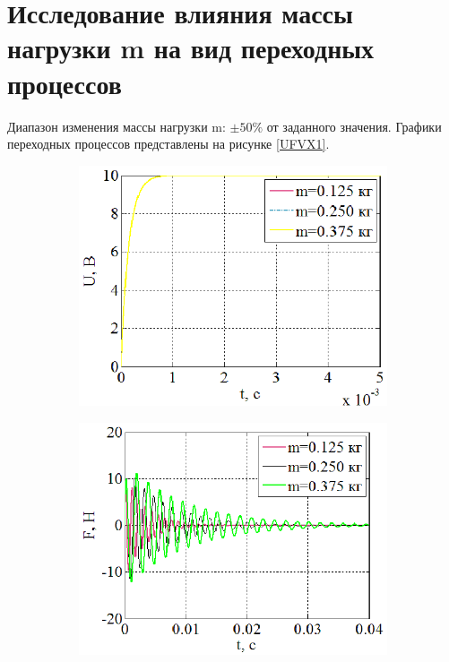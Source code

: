 \documentclass[a4paper,12pt]{article} %
\begin{document}
\section{Исследование влияния массы нагрузки m на вид переходных процессов}
Диапазон изменения массы нагрузки m: $\pm 50\%$  от заданного значения. Графики переходных процессов представлены на рисунке \ref{UFVX1}.
\begin{figure}[H]
	\centering
	\begin{subfigure}[b]{0.48\textwidth}
	    \includegraphics[width = \textwidth]{scheme/U1}
	\end{subfigure}
	\hfill
	\begin{subfigure}[b]{0.48\textwidth}
		\includegraphics[width = \textwidth]{scheme/F1}

\end{subfigure}
\end{figure}
\end{document}

